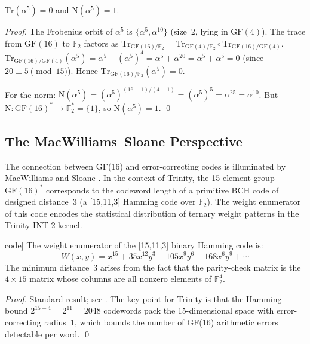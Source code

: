 \begin{proposition}
\(\mathrm{Tr}(\alpha^5) = 0\) and \(\mathrm{N}(\alpha^5) = 1\).
\end{proposition}

\begin{proof}
The Frobenius orbit of \(\alpha^5\) is \(\{\alpha^5,\alpha^{10}\}\)
(size~2, lying in \(\mathrm{GF}(4)\)).
The trace from \(\mathrm{GF}(16)\) to \(\mathbb{F}_2\) factors as
\(\mathrm{Tr}_{\mathrm{GF}(16)/\mathbb{F}_2}
  = \mathrm{Tr}_{\mathrm{GF}(4)/\mathbb{F}_2}\circ
    \mathrm{Tr}_{\mathrm{GF}(16)/\mathrm{GF}(4)}\).
\(\mathrm{Tr}_{\mathrm{GF}(16)/\mathrm{GF}(4)}(\alpha^5)
  = \alpha^5 + (\alpha^5)^4 = \alpha^5 + \alpha^{20}
  = \alpha^5 + \alpha^5 = 0\)
(since \(20\equiv 5\pmod{15}\)).
Hence \(\mathrm{Tr}_{\mathrm{GF}(16)/\mathbb{F}_2}(\alpha^5)=0\).

For the norm: \(\mathrm{N}(\alpha^5) = (\alpha^5)^{(16-1)/(4-1)}
= (\alpha^5)^5 = \alpha^{25} = \alpha^{10}\).
But \(\mathrm{N}\colon\mathrm{GF}(16)^*\to\mathbb{F}_2^*=\{1\}\),
so \(\mathrm{N}(\alpha^5)=1\).
\qed
\end{proof}

\subsection{The MacWilliams–Sloane Perspective}

The connection between GF(16) and error-correcting codes is
illuminated by MacWilliams and Sloane \cite{macwilliams_sloane}.
In the context of Trinity, the 15-element group \(\mathrm{GF}(16)^*\)
corresponds to the codeword length of a primitive BCH code of designed
distance~3 (a [15,11,3] Hamming code over \(\mathbb{F}_2\)).
The weight enumerator of this code encodes the statistical distribution
of ternary weight patterns in the Trinity INT-2 kernel.

\begin{proposition}[Weight enumerator of the [15,11,3] code]
\label{prop:weight-enum}
The weight enumerator of the [15,11,3] binary Hamming code is:
\[
  W(x,y) = x^{15} + 35x^{12}y^3 + 105x^9y^6 + 168x^6y^9 + \cdots
\]
The minimum distance~3 arises from the fact that the parity-check matrix is the
\(4\times 15\) matrix whose columns are all nonzero elements of \(\mathbb{F}_2^4\).
\end{proposition}

\begin{proof}
Standard result; see \textcite[Chapter~1]{macwilliams_sloane}.
The key point for Trinity is that the Hamming bound
\(2^{15-4}=2^{11}=2048\) codewords pack the 15-dimensional space with
error-correcting radius~1,
which bounds the number of GF(16) arithmetic errors detectable per word.
\qed
\end{proof}

